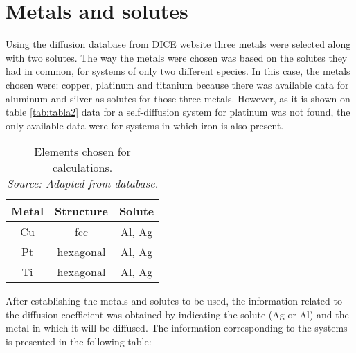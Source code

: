 \section{Metals and solutes}

Using the diffusion database from DICE website three metals were selected along with two solutes. The way the metals were chosen was based on the solutes they had in common, for systems of only two different species. In this case, the metals chosen were: copper, platinum and titanium because there was available data for aluminum and silver as solutes for those three metals. However, as it is shown on table \ref{tab:tabla2} data for a self-diffusion system for platinum was not found, the only available data were for systems in which iron is also present. 

\begin{table}[h]
    \centering
    \captionsetup{justification=centering}
    \begin{tabular}{ccc}
        Metal & Structure & Solute\\ \hline \hline
        Cu & fcc & Al, Ag \\
        Pt & hexagonal & Al, Ag \\
        Ti & hexagonal & Al, Ag \\
    \end{tabular}
    \caption{Elements chosen for calculations. \\ 
    \textit{Source: Adapted from \citep{kakusan} database.}}
    \label{tab:tabla1}
\end{table}

After establishing the metals and solutes to be used, the information related to the diffusion coefficient was obtained by indicating the solute (Ag or Al) and the metal in which it will be diffused. The information corresponding to the systems is presented in the following table:

